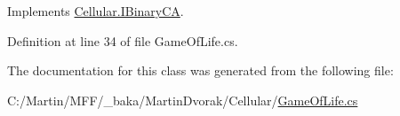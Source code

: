 Implements \hyperlink{interface_cellular_1_1_i_binary_c_a_aa67feabf5d1513aa74076d255c661948}{Cellular.\+I\+Binary\+C\+A}.



Definition at line 34 of file Game\+Of\+Life.\+cs.



The documentation for this class was generated from the following file\+:\begin{DoxyCompactItemize}
\item 
C\+:/\+Martin/\+M\+F\+F/\+\_\+baka/\+Martin\+Dvorak/\+Cellular/\hyperlink{_game_of_life_8cs}{Game\+Of\+Life.\+cs}\end{DoxyCompactItemize}
